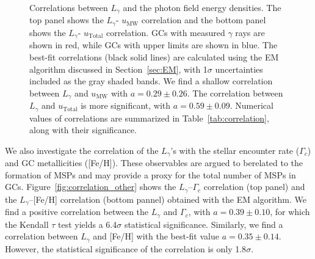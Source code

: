 \documentclass[doublespace,nopageskip]{VTthesis} %
\begin{document}
\begin{figure}
    \caption{\label{fig:correlation_urad} Correlations between $L_\gamma$ and the photon field energy densities. The top panel shows the $L_\gamma$- $u_\mathrm{MW}$ correlation and the bottom panel shows the $L_\gamma$- $u_\mathrm{Total}$ correlation. GCs with measured $\gamma$ rays are shown in red, while GCs with upper limits are shown in blue. The best-fit correlations (black solid lines) are calculated using the EM algorithm discussed in Section~\ref{sec:EM}, with 1$\sigma$ uncertainties included as the gray shaded bands. We find a shallow correlation between $L_\gamma$ and $u_\mathrm{MW}$ with $a = 0.29 \pm 0.26$. The correlation between $L_\gamma$ and $u_\mathrm{Total}$ is more significant, with $a = 0.59 \pm 0.09$. Numerical values of correlations are summarized in Table~\ref{tab:correlation}, along with their significance.
    }
\end{figure}

We also investigate the correlation of the $L_\gamma$'s with the stellar encounter rate ($\Gamma_c$) and GC metallicities ([Fe/H]). These observables are argued to berelated to the formation of MSPs and may provide a proxy for the total number of MSPs in GCs. Figure~\ref{fig:correlation_other} shows the $L_\gamma$--$\Gamma_c$ correlation (top panel) and the $L_\gamma$--[Fe/H] correlation (bottom pannel) obtained with the EM algorithm. We find a positive correlation between the $L_\gamma$ and $\Gamma_c$, with $a = 0.39 \pm 0.10$, for which the Kendall $\tau$ test yields a 6.4$\sigma$ statistical significance. Similarly, we find a correlation between $L_\gamma$ and [Fe/H] with the best-fit value $a = 0.35 \pm 0.14$. However, the statistical significance of the correlation is only 1.8$\sigma$. 
\end{document}
